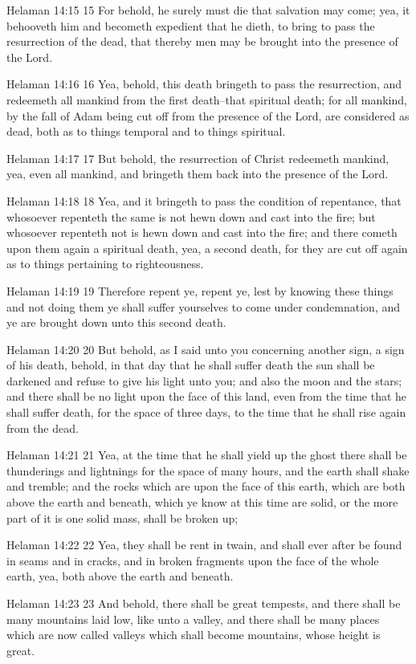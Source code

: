 Helaman 14:15
 15 For behold, he surely must die that salvation may come; yea,
it behooveth him and becometh expedient that he dieth, to bring
to pass the resurrection of the dead, that thereby men may be
brought into the presence of the Lord.

Helaman 14:16
 16 Yea, behold, this death bringeth to pass the resurrection,
and redeemeth all mankind from the first death--that spiritual
death; for all mankind, by the fall of Adam being cut off from
the presence of the Lord, are considered as dead, both as to
things temporal and to things spiritual.

Helaman 14:17
 17 But behold, the resurrection of Christ redeemeth mankind,
yea, even all mankind, and bringeth them back into the presence
of the Lord.

Helaman 14:18
 18 Yea, and it bringeth to pass the condition of repentance,
that whosoever repenteth the same is not hewn down and cast into
the fire; but whosoever repenteth not is hewn down and cast into
the fire; and there cometh upon them again a spiritual death,
yea, a second death, for they are cut off again as to things
pertaining to righteousness.

Helaman 14:19
 19 Therefore repent ye, repent ye, lest by knowing these things
and not doing them ye shall suffer yourselves to come under
condemnation, and ye are brought down unto this second death.

Helaman 14:20
 20 But behold, as I said unto you concerning another sign, a
sign of his death, behold, in that day that he shall suffer death
the sun shall be darkened and refuse to give his light unto you;
and also the moon and the stars; and there shall be no light upon
the face of this land, even from the time that he shall suffer
death, for the space of three days, to the time that he shall
rise again from the dead.

Helaman 14:21
 21 Yea, at the time that he shall yield up the ghost there shall
be thunderings and lightnings for the space of many hours, and
the earth shall shake and tremble; and the rocks which are upon
the face of this earth, which are both above the earth and
beneath, which ye know at this time are solid, or the more part
of it is one solid mass, shall be broken up;

Helaman 14:22
 22 Yea, they shall be rent in twain, and shall ever after be
found in seams and in cracks, and in broken fragments upon the
face of the whole earth, yea, both above the earth and beneath.

Helaman 14:23
 23 And behold, there shall be great tempests, and there shall be
many mountains laid low, like unto a valley, and there shall be
many places which are now called valleys which shall become
mountains, whose height is great.

